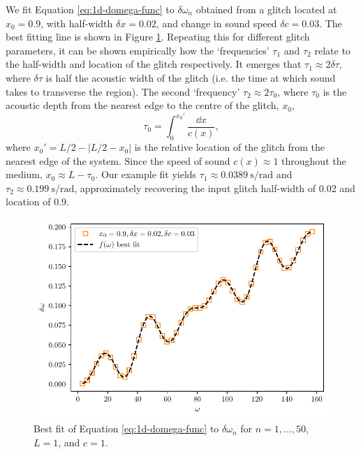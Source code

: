 We fit Equation \ref{eq:1d-domega-func} to \(\delta\omega_n\) obtained from a glitch located at \(x_0 = 0.9\), with half-width \(\delta x = 0.02\), and change in sound speed \(\delta c = 0.03\). The best fitting line is shown in Figure \ref{fig:1d-fit}. Repeating this for different glitch parameters, it can be shown empirically how the `frequencies' \(\tau_1\) and \(\tau_2\) relate to the half-width and location of the glitch respectively. It emerges that \(\tau_1 \approx 2\delta\tau\), where \(\delta\tau\) is half the acoustic width of the glitch (i.e. the time at which sound takes to transverse the region). The second `frequency' \(\tau_2 \approx 2\tau_0\), where \(\tau_0\) is the acoustic depth from the nearest edge to the centre of the glitch, \(x_0\),
%
\begin{equation}
    \tau_0 = \int_0^{x_0'} \frac{\dd x}{c(x)},
\end{equation}
%
where \(x_0' = L/2 - | L/2 - x_0 |\) is the relative location of the glitch from the nearest edge of the system. Since the speed of sound \(c(x) \approx 1\) throughout the medium, \(x_0 \approx L - \tau_0\). Our example fit yields \(\tau_1 \approx \SI{0.0389}{\second\per\radian}\) and \(\tau_2 \approx \SI{0.199}{\second\per\radian}\), approximately recovering the input glitch half-width of \num{0.02} and location of \num{0.9}.


\begin{figure}
    \centering
    \includegraphics{figures/glitch-1d-fit.pdf}
    \caption{Best fit of Equation \ref{eq:1d-domega-func} to \(\delta\omega_n\) for \(n=1,\dots,50\), \(L=1\), and \(c=1\).}
    \label{fig:1d-fit}
\end{figure}

